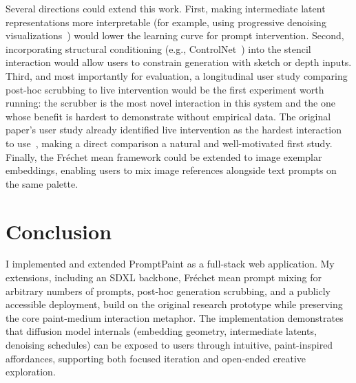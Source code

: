 \documentclass[sigconf]{acmart}
\begin{document}
Several directions could extend this work. First, making intermediate
latent representations more interpretable (for example, using progressive
denoising visualizations~\cite{ho2020denoising}) would lower the learning
curve for prompt intervention. Second, incorporating structural conditioning
(e.g., ControlNet~\cite{zhang2023adding}) into the stencil interaction
would allow users to constrain generation with sketch or depth inputs.
Third, and most importantly for evaluation, a longitudinal user study
comparing post-hoc scrubbing to live intervention would be the first
experiment worth running: the scrubber is the most novel interaction in
this system and the one whose benefit is hardest to demonstrate without
empirical data. The original paper's user study already identified live
intervention as the hardest interaction to use~\cite{chung2023promptpaint},
making a direct comparison a natural and well-motivated first study. Finally, the Fréchet mean framework could be extended
to image exemplar embeddings, enabling users to mix image references
alongside text prompts on the same palette.

\section{Conclusion}

I implemented and extended PromptPaint as a full-stack web application.
My extensions, including an SDXL backbone, Fréchet mean prompt mixing for arbitrary
numbers of prompts, post-hoc generation scrubbing, and a publicly accessible
deployment, build on the original research prototype while preserving the core
paint-medium interaction metaphor. The implementation demonstrates that diffusion model internals
(embedding geometry, intermediate latents, denoising schedules) can be
exposed to users through intuitive, paint-inspired affordances, supporting
both focused iteration and open-ended creative exploration.

\clearpage


\end{document}
